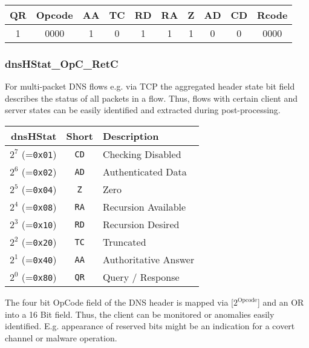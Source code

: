 \documentclass[documentation]{subfiles}
\begin{document}
\begin{longtable}{cccccccccc}
    \toprule
    {\bf QR} & {\bf Opcode} & {\bf AA} & {\bf TC} & {\bf RD} & {\bf RA} & {\bf Z} & {\bf AD} & {\bf CD} & {\bf Rcode} \\
    \midrule\endhead%
    1 & 0000 & 1 & 0 & 1 & 1 & 1 & 0 & 0 & 0000 \\
    \bottomrule
\end{longtable}

\subsubsection{dnsHStat\_OpC\_RetC}\label{dnsHStatOpCRetC}
For multi-packet DNS flows e.g. via TCP the aggregated header state bit field describes
the status of all packets in a flow. Thus, flows with certain client and server states can
be easily identified and extracted during post-processing.

\begin{longtable}{rcl}
    \toprule
    {\bf dnsHStat} & {\bf Short} & {\bf Description}\\
    \midrule\endhead%
    $2^7$ (={\tt 0x01}) & {\tt CD} & Checking Disabled \\
    $2^6$ (={\tt 0x02}) & {\tt AD} & Authenticated Data \\
    $2^5$ (={\tt 0x04}) & {\tt Z}  & Zero \\
    $2^4$ (={\tt 0x08}) & {\tt RA} & Recursion Available \\
    $2^3$ (={\tt 0x10}) & {\tt RD} & Recursion Desired \\
    $2^2$ (={\tt 0x20}) & {\tt TC} & Truncated \\
    $2^1$ (={\tt 0x40}) & {\tt AA} & Authoritative Answer \\
    $2^0$ (={\tt 0x80}) & {\tt QR} & Query / Response \\
    \bottomrule
\end{longtable}

The four bit OpCode field of the DNS header is mapped via [$2^{\text{Opcode}}$] and an OR
into a 16 Bit field. Thus, the client can be monitored or anomalies easily identified.
E.g. appearance of reserved bits might be an indication for a covert channel or
malware operation.
\end{document}
